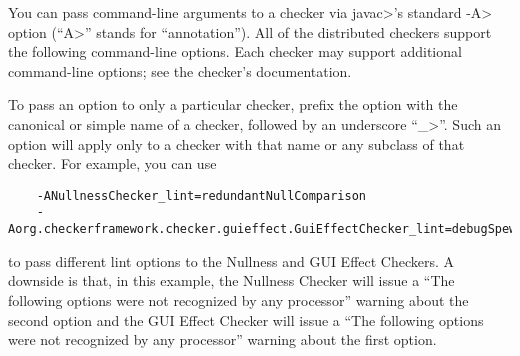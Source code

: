 
You can pass command-line arguments to a checker via \<javac>'s standard \<-A>
option (``\<A>'' stands for ``annotation'').  All of the distributed
checkers support the following command-line options.
Each checker may support additional command-line options; see the checker's
documentation.

To pass an option to only a particular checker,
prefix the option with the canonical or simple name
of a checker, followed by an underscore ``\<\_>''.
Such an option will apply only to a checker with that name or any subclass of that checker.
For example, you can use
\begin{Verbatim}
    -ANullnessChecker_lint=redundantNullComparison
    -Aorg.checkerframework.checker.guieffect.GuiEffectChecker_lint=debugSpew
\end{Verbatim}

\noindent
to pass different lint options to the Nullness and GUI Effect Checkers.  A
downside is that, in this example, the Nullness Checker will issue a
``The following options were not recognized by any processor'' warning
about the second option and the GUI Effect Checker will issue a
``The following options were not recognized by any processor'' warning
about the first option.


